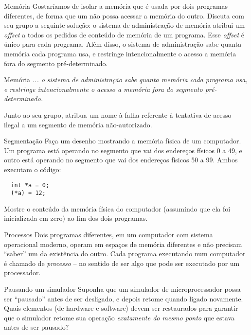 \documentclass{beamer}
\begin{document}
\begin{frame}[fragile]{Memória}
  \centering
  \large
  Gostaríamos de isolar a memória que é usada por dois programas diferentes, de
  forma que um não possa acessar a memória do outro. Discuta com seu grupo a
  seguinte solução: o sistema de administração de memória atribui um
  \textit{offset} a todos os pedidos de conteúdo de memória de um programa. Esse
  \textit{offset} é único para cada programa. Além disso, o sistema de
  administração sabe quanta memória cada programa usa, e restringe
  intencionalmente o acesso a memória fora do segmento pré-determinado.
\end{frame}


\begin{frame}[fragile]{Memória}
  \centering
  \large
  \textit{... o sistema de
  administração sabe quanta memória cada programa usa, e restringe
  intencionalmente o acesso a memória fora do segmento pré-determinado.}

  Junto ao seu grupo, atribua um nome à falha referente à tentativa de acesso
  ilegal a um segmento de memória não-autorizado.
\end{frame}


\begin{frame}[fragile]{Segmentação}
  \centering
  \large
  Faça um desenho mostrando a memória física de um computador. Um programa está
  operando no segmento que vai dos endereços físicos 0 a 49, e outro está operando no
  segmento que vai dos endereços físicos 50 a 99. Ambos executam o código:
  \begin{verbatim}
  int *a = 0;
  (*a) = 12;
  \end{verbatim}

  Mostre o conteúdo da memória física do computador (assumindo que ela foi
  inicializada em zero) ao fim dos dois programas.
\end{frame}


\begin{frame}[fragile]{Processos}
  \centering
  \large
  Dois programas diferentes, em um computador com sistema operacional moderno,
  operam em espaços de memória diferentes e não precisam ``saber'' um da
  existência do outro. Cada programa executando num computador é chamado de
  \textit{processo} -- no sentido de ser algo que pode ser executado por um
  processador.
\end{frame}

\begin{frame}{Pausando um simulador}
  \large
  Suponha que um simulador de microprocessador possa ser
  ``pausado'' antes de ser desligado, e
  depois retome quando ligado novamente. Quais elementos (de
  hardware e software) devem ser restaurados para garantir que o simulador
  retome sua operação \textit{exatamente do mesmo ponto} que estava antes de ser
  pausado?
\end{frame}
\end{document}

